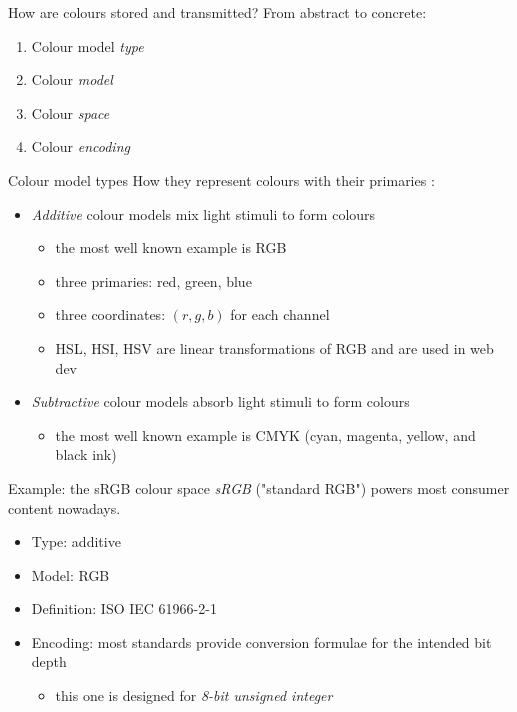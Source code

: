 \documentclass[aspectratio=169,handout,usepdftitle=false]{fireshonks}
\begin{document}
\begin{frame}{How are colours stored and transmitted?}
    From abstract to concrete:
    \begin{enumerate}
        \item Colour model \emph{type}
        \item Colour \emph{model}
        \item Colour \emph{space}
        \item Colour \emph{encoding}
    \end{enumerate}
\end{frame}
\begin{frame}{Colour model types}
    How they represent colours with their primaries \autocite{allen23}:
    \begin{itemize}
        \item \emph{Additive} colour models mix light stimuli to form colours
              \begin{itemize}
                  \item the most well known example is RGB
                  \item three primaries: red, green, blue
                  \item three coordinates: $(r, g, b)$ for each channel
                  \item HSL, HSI, HSV are linear transformations of RGB and are used in web dev
              \end{itemize}
        \item \emph{Subtractive} colour models absorb light stimuli to form colours
              \begin{itemize}
                  \item the most well known example is CMYK (cyan, magenta, yellow, and black ink)
              \end{itemize}
    \end{itemize}
\end{frame}
\begin{frame}{Example: the sRGB colour space}
    \emph{sRGB} ("standard RGB") powers most consumer content nowadays.
    \begin{itemize}
        \item Type: additive
        \item Model: RGB
        \item Definition: ISO IEC 61966-2-1 \parencite*{srgb2002} 
        \item Encoding: most standards provide conversion formulae for the intended bit depth
              \begin{itemize}
                  \item this one is designed for \emph{8-bit unsigned integer}
              \end{itemize}
    \end{itemize}
\end{frame}
\end{document}
